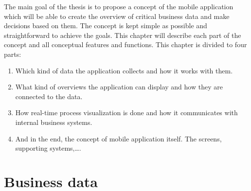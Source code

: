 
The main goal of the thesis is to propose a concept of the mobile application which will be able to create the overview of critical business data and make decisions based on them. The concept is kept simple as possible and straightforward to achieve the goals. This chapter will describe each part of the concept and all conceptual features and functions. This chapter is divided to four parts:	
    \begin{enumerate}
      \item Which kind of data the application collects and how it works with them.
      \item What kind of overviews the application can display and how they are connected to the data.
      \item How real-time process visualization is done and how it communicates with internal business systems.
      \item And in the end, the concept of mobile application itself. The screens, supporting systems,\dots {}.
    \end{enumerate}
    
    \section{Business data}
    
